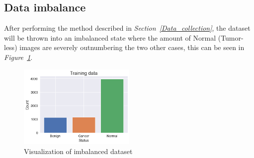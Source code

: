 \documentclass[12pt]{extarticle}
\begin{document}
	\subsection{Data imbalance}
	After performing the method described in \emph{Section~\ref{Data_collection}}, the dataset will be thrown into an imbalanced state where the amount of Normal (Tumor-less) images are severely outnumbering the two other cases, this can be seen in \emph{Figure~\ref{fig:imbalance}}.
	\begin{figure}[h]
		\centering
		\includegraphics[width=0.5\textwidth]{pics/Figures/Train_imbalance.png}
		\caption{\small{Visualization of imbalanced dataset}}
		\label{fig:imbalance}
	\end{figure}
	
\end{document}
